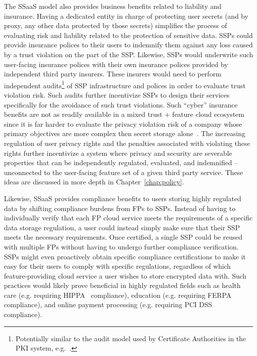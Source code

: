 The SSaaS model also provides business benefits related to liability
and insurance. Having a dedicated entity in charge of protecting user
secrets (and by proxy, any other data protected by those secrets)
simplifies the process of evaluating risk and liability related to the
protection of sensitive data. SSPs could provide insurance polices to
their users to indemnify them against any loss caused by a trust
violation on the part of the SSP. Likewise, SSPs would underwrite such
user-facing insurance polices with their own insurance polices
provided by independent third party insurers. These insurers would
need to perform independent audits\footnote{Potentially similar to the
  audit model used by Certificate Authorities in the PKI system,
  e.g.~\cite{hall-caaudit, mozilla-capolicy}.} of SSP infrastructure
and polices in order to evaluate trust violation risk. Such audits
further incentivize SSPs to design their services specifically for the
avoidance of such trust violations. Such ``cyber'' insurance benefits
are not as readily available in a mixed trust + feature cloud
ecosystem since it is far harder to evaluate the privacy violation
risk of a company whose primary objectives are more complex then
secret storage alone~\cite{ciab2015}. The increasing regulation of
user privacy rights and the penalties associated with violating these
rights further incentivize a system where privacy and security are
severable properties that can be independently regulated, evaluated,
and indemnified -- unconnected to the user-facing feature set of a
given third party service. These ideas are discussed in more depth in
Chapter~\ref{chap:policy}.

Likewise, SSaaS provides compliance benefits to users storing highly
regulated data by shifting compliance burdens from FPs to
SSPs. Instead of having to individually verify that each FP cloud
service meets the requirements of a specific data storage regulation,
a user could instead simply make sure that their SSP meets the
necessary requirements. Once certified, a single SSP could be reused
with multiple FPs without having to undergo further compliance
verification. SSPs might even proactively obtain specific compliance
certifications to make it easy for their users to comply with specific
regulations, regardless of which feature-providing cloud service a
user wishes to store encrypted data with. Such practices would likely
prove beneficial in highly regulated fields such as health care
(e.g. requiring HIPPA~\cite{hippa} compliance), education
(e.g. requiring FERPA~\cite{ferpa} compliance), and online payment
processing (e.g. requiring PCI DSS~\cite{pcidss} compliance).

